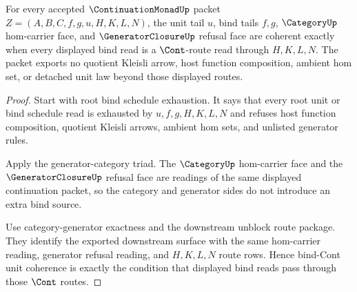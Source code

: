 \begin{theorem}
\label{thm:continuation-monad-bind-cont-unit-coherence}
For every accepted $\ContinuationMonadUp$ packet $Z=(A,B,C,f,g,u,H,K,L,N)$, the unit tail $u$, bind tails $f,g$, $\CategoryUp$ hom-carrier face, and $\GeneratorClosureUp$ refusal face are coherent exactly when every displayed bind read is a $\Cont$-route read through $H,K,L,N$. The packet exports no quotient Kleisli arrow, host function composition, ambient hom set, or detached unit law beyond those displayed routes.
\end{theorem}
\begin{proof}
Start with root bind schedule exhaustion. It says that every root unit or bind schedule read is exhausted by $u,f,g,H,K,L,N$ and refuses host function composition, quotient Kleisli arrows, ambient hom sets, and unlisted generator rules.

Apply the generator-category triad. The $\CategoryUp$ hom-carrier face and the $\GeneratorClosureUp$ refusal face are readings of the same displayed continuation packet, so the category and generator sides do not introduce an extra bind source.

Use category-generator exactness and the downstream unblock route package. They identify the exported downstream surface with the same hom-carrier reading, generator refusal reading, and $H,K,L,N$ route rows. Hence bind-Cont unit coherence is exactly the condition that displayed bind reads pass through those $\Cont$ routes.
\end{proof}

